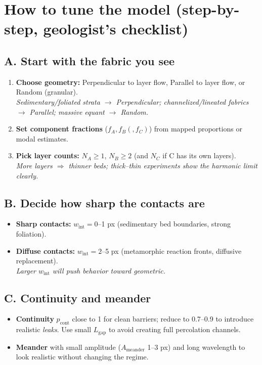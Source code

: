 \documentclass[11pt,a4paper]{article}
\begin{document}
\section{How to tune the model (step-by-step, geologist's checklist)}
\subsection*{A. Start with the fabric you see}
\begin{enumerate}[leftmargin=*]
\item \textbf{Choose geometry:} Perpendicular to layer flow, Parallel to layer flow, or Random (granular).\\
\emph{Sedimentary/foliated strata $\to$ Perpendicular; channelized/lineated fabrics $\to$ Parallel; massive equant $\to$ Random.}
\item \textbf{Set component fractions} ($f_A,f_B(,f_C)$) from mapped proportions or modal estimates.
\item \textbf{Pick layer counts:} $N_A\!\ge\!1$, $N_B\!\ge\!2$ (and $N_C$ if C has its own layers).\\
\emph{More layers $\Rightarrow$ thinner beds; thick--thin experiments show the harmonic limit clearly.}
\end{enumerate}

\subsection*{B. Decide how sharp the contacts are}
\begin{itemize}[leftmargin=*]
\item \textbf{Sharp contacts:} $w_{\text{int}}=0$--1 px (sedimentary bed boundaries, strong foliation).
\item \textbf{Diffuse contacts:} $w_{\text{int}}=2$--5 px (metamorphic reaction fronts, diffusive replacement).\\
\emph{Larger $w_{\text{int}}$ will push behavior toward geometric.}
\end{itemize}

\subsection*{C. Continuity and meander}
\begin{itemize}[leftmargin=*]
\item \textbf{Continuity} $p_{\text{cont}}$ close to 1 for clean barriers; reduce to 0.7--0.9 to introduce realistic \emph{leaks}. Use small $L_{\text{gap}}$ to avoid creating full percolation channels.
\item \textbf{Meander} with small amplitude ($A_{\text{meander}}$ 1--3 px) and long wavelength to look realistic without changing the regime.
\end{itemize}
\end{document}
